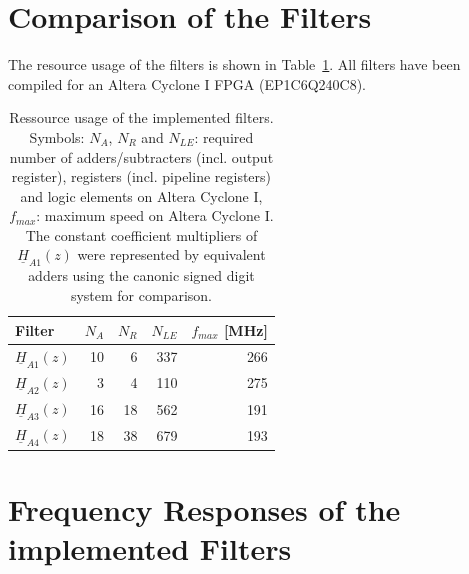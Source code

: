 \documentclass[a4paper,BCOR7mm,12pt,pointlessnumbers,bibtotoc]{scrartcl}
\begin{document}
\section{Comparison of the Filters}

The resource usage of the filters is shown in Table~\ref{tab:filter_performance}. All filters have been compiled for an Altera Cyclone I FPGA (EP1C6Q240C8).

\begin{table}[H]
  \centering
    \begin{tabular}{l|r|r|r|r}
      \hline
      \hline
        Filter         & $N_A$ & $N_R$ & $N_{LE}$ & $f_{max}$ [MHz]\\
        \hline                        
        $\underline{H}_{A1}(z)$ & 10    & 6  & 337 & 266\\
        $\underline{H}_{A2}(z)$ & 3     & 4  & 110 & 275\\ 
        $\underline{H}_{A3}(z)$ & 16    & 18 & 562 & 191\\
        $\underline{H}_{A4}(z)$ & 18    & 38 & 679 & 193\\ 
      \hline
      \hline
    \end{tabular}
  \caption{Ressource usage of the implemented filters. Symbols: $N_A$, $N_R$ and $N_{LE}$: required number of adders/subtracters (incl. output register), registers (incl. pipeline registers) and logic elements on Altera Cyclone I, $f_{max}$: maximum speed on Altera Cyclone I. The constant coefficient multipliers of $\underline{H}_{A1}(z)$ were represented by equivalent adders using the canonic signed digit system \cite{mb07} for comparison.}
  \label{tab:filter_performance}
\end{table}

\section{Frequency Responses of the implemented Filters}
\end{document}
